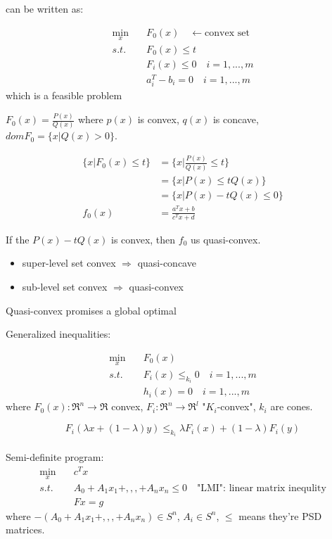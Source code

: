 can be written as:


\begin{align*}
\min_x\quad & F_0(x) \quad \leftarrow \text{convex set}\\
s.t.\quad  & F_0(x) \leq t  \\
& F_i(x) \leq 0 \quad i = 1,...,m \\
& a_i^T - b_i = 0\quad i = 1,...,m
\end{align*}
which is a feasible problem

\begin{example}
	$F_0(x) = \frac{P(x)}{Q(x)}$ where $p(x)$ is convex, $q(x)$ is concave, $domF_0 = \{x\vert Q(x) >0 \}$.
	
	\begin{align*}
	\{x\vert F_0(x) \leq t \} &= \{x\vert \frac{P(x)}{Q(x)}\leq t \}\\
	&= \{x\vert P(x)\leq tQ(x) \}\\
	&= \{x\vert P(x) - tQ(x)\leq 0 \}\\
	f_0(x) &= \frac{a^Tx + b}{c^Tx+d}
	\end{align*}
	
	If the $P(x) - tQ(x)$ is convex, then $f_0$ us quasi-convex.
	
	\begin{itemize}
		\item super-level set convex $\Rightarrow$ quasi-concave
		
		\item sub-level set convex $\Rightarrow$ quasi-convex
	\end{itemize}
	
	Quasi-convex promises a global optimal
\end{example}

Generalized inequalities:

\begin{align*}
\min_x\quad & F_0(x) \\
s.t.\quad & F_i(x) \leq_{k_i} 0 \quad i = 1,...,m\\
& h_i(x) = 0\quad i = 1,...,m 
\end{align*}
where $F_0(x): \Re^n\rightarrow \Re$ convex, $F_i: \Re^n\rightarrow \Re^l$ "$K_i$-convex", $k_i$ are cones.

\begin{equation*}
	F_i(\lambda x + (1-\lambda)y)\leq_{k_i} \lambda F_i(x) + (1-\lambda)F_i(y)
\end{equation*}\\

Semi-definite program:
\begin{align*}
\min_x\quad & c^Tx \\
s.t.\quad & A_0+A_1x_1+,,,+A_nx_n\leq 0\quad \text{"LMI": linear matrix inequlity}\\
& Fx = g
\end{align*}
where $-(A_0+A_1x_1+,,,+A_nx_n)\in S^n$, $A_i\in S^n$, $\leq$ means they're PSD matrices.




